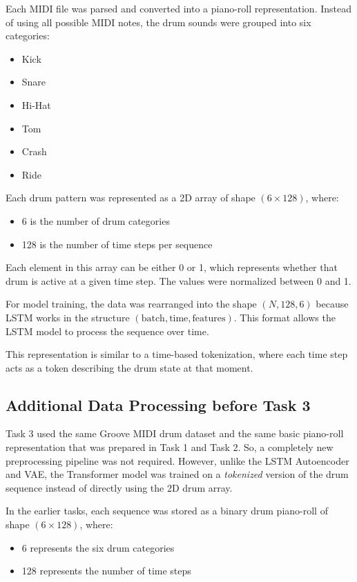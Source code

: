 \documentclass[conference]{IEEEtran}
\begin{document}
Each MIDI file was parsed and converted into a piano-roll representation. Instead of using all possible MIDI notes, the drum sounds were grouped into six categories:
\begin{itemize}
    \item Kick
    \item Snare
    \item Hi-Hat
    \item Tom
    \item Crash
    \item Ride
\end{itemize}

Each drum pattern was represented as a 2D array of shape $(6 \times 128)$, where:
\begin{itemize}
    \item 6 is the number of drum categories
    \item 128 is the number of time steps per sequence
\end{itemize}
Each element in this array can be either 0 or 1, which represents whether that drum is active at a given time step. The values were normalized between 0 and 1.

For model training, the data was rearranged into the shape $(N, 128, 6)$ because LSTM works in the structure $(\text{batch}, \text{time}, \text{features})$. This format allows the LSTM model to process the sequence over time.

This representation is similar to a time-based tokenization, where each time step acts as a token describing the drum state at that moment.

\subsection{Additional Data Processing before Task 3}
Task 3 used the same Groove MIDI drum dataset and the same basic piano-roll representation that was prepared in Task 1 and Task 2. So, a completely new preprocessing pipeline was not required. However, unlike the LSTM Autoencoder and VAE, the Transformer model was trained on a \textit{tokenized} version of the drum sequence instead of directly using the 2D drum array.

In the earlier tasks, each sequence was stored as a binary drum piano-roll of shape $(6 \times 128)$, where:
\begin{itemize}
    \item 6 represents the six drum categories
    \item 128 represents the number of time steps
\end{itemize}
\end{document}
